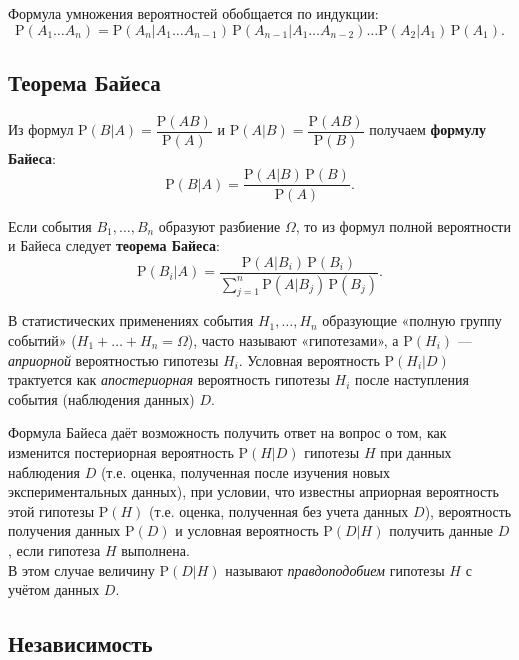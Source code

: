 \documentclass[11pt,a4paper]{article}
\begin{document}
Формула умножения вероятностей обобщается по индукции:
\[ \mathrm{P}(A_1 \ldots A_n) = \mathrm{P}(A_n|A_1 \ldots A_{n-1}) \, \mathrm{P}(A_{n-1}|A_1 \ldots A_{n-2}) \ldots \mathrm{P}(A_2 |A_1) \, \mathrm{P}(A_1) . \]

    \hypertarget{ux442ux435ux43eux440ux435ux43cux430-ux431ux430ux439ux435ux441ux430}{%
\subsection{Теорема
Байеса}\label{ux442ux435ux43eux440ux435ux43cux430-ux431ux430ux439ux435ux441ux430}}

Из формул \(\mathrm{P}(B|A) = \dfrac{\mathrm{P}(AB)}{\mathrm{P}(A)}\) и
\(\mathrm{P}(A|B) = \dfrac{\mathrm{P}(AB)}{\mathrm{P}(B)}\) получаем
\textbf{формулу Байеса}:
\[ \mathrm{P}(B|A) = \dfrac{\mathrm{P}(A|B) \, \mathrm{P}(B)}{\mathrm{P}(A)}. \]

Если события \(B_1, \dots, B_n\) образуют разбиение \(\Omega\), то из
формул полной вероятности и Байеса следует \textbf{теорема Байеса}:
\[ \mathrm{P}(B_i|A) = \frac{\mathrm{P}(A|B_i) \, \mathrm{P}(B_i)}{\sum_{j=1}^{n} \mathrm{P}(A|B_j) \,\mathrm{P}(B_j)}. \]

    В статистических применениях события \(H_1, \dots, H_n\) образующие
«полную группу событий» (\(H_1 + \dots + H_n = \Omega\)), часто называют
«гипотезами», а \(\mathrm{P}(H_i)\) --- \emph{априорной} вероятностью
гипотезы \(H_i\). Условная вероятность \(\mathrm{P}(H_i|D)\) трактуется
как \emph{апостериорная} вероятность гипотезы \(H_i\) после наступления
события (наблюдения данных) \(D\).

Формула Байеса даёт возможность получить ответ на вопрос о том, как
изменится постериорная вероятность \(\mathrm{P}(H|D)\) гипотезы \(H\)
при данных наблюдения \(D\) (т.е. оценка, полученная после изучения
новых экспериментальных данных), при условии, что известны априорная
вероятность этой гипотезы \(\mathrm{P}(H)\) (т.е. оценка, полученная без
учета данных \(D\)), вероятность получения данных \(\mathrm{P}(D)\) и
условная вероятность \(\mathrm{P}(D|H)\) получить данные \(D\), если
гипотеза \(H\) выполнена.\\
В этом случае величину \(\mathrm{P}(D|H)\) называют
\emph{правдоподобием} гипотезы \(H\) с учётом данных \(D\).

    \hypertarget{ux43dux435ux437ux430ux432ux438ux441ux438ux43cux43eux441ux442ux44c}{%
\subsection{Независимость}\label{ux43dux435ux437ux430ux432ux438ux441ux438ux43cux43eux441ux442ux44c}}
\end{document}
